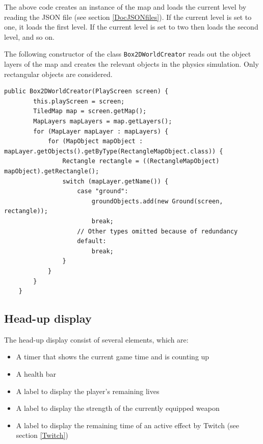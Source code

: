 \documentclass[12p]{article}
\begin{document}
The above code creates an instance of the map and loads the current level by reading the JSON file (see section \ref{DocJSONfiles}). If the current level is set to one, it loads the first level. If the current level is set to two then loads the second level, and so on.

The following constructor of the class \texttt{Box2DWorldCreator} reads out the object layers of the map and creates the relevant objects in the physics simulation. Only rectangular objects are considered.

\newpage

\begin{verbatim}
public Box2DWorldCreator(PlayScreen screen) {
        this.playScreen = screen;
        TiledMap map = screen.getMap();
        MapLayers mapLayers = map.getLayers();
        for (MapLayer mapLayer : mapLayers) {
            for (MapObject mapObject : mapLayer.getObjects().getByType(RectangleMapObject.class)) {
                Rectangle rectangle = ((RectangleMapObject) mapObject).getRectangle();
                switch (mapLayer.getName()) {
                    case "ground":
                        groundObjects.add(new Ground(screen, rectangle));
                        break;
                    // Other types omitted because of redundancy
                    default:
                        break;
                }
            }
        }
    }
\end{verbatim}


\newpage
\subsection{Head-up display} \label{DocHUD}

The head-up display consist of several elements, which are:

\begin{itemize}
    \item A timer that shows the current game time and is counting up
    \item A health bar
    \item A label to display the player's remaining lives
    \item A label to display the strength of the currently equipped weapon
    \item A label to display the remaining time of an active effect by Twitch (see section \ref{Twitch})
\end{itemize}
\end{document}
